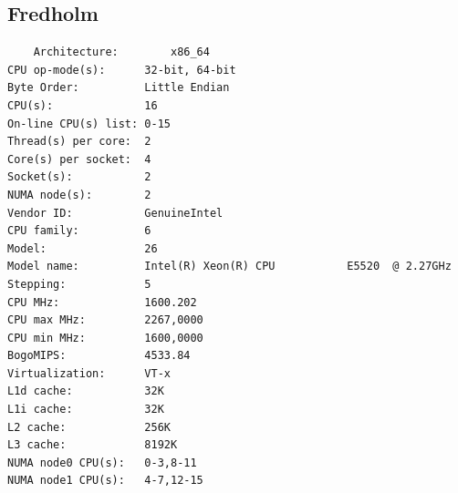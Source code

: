 \documentclass{article}
\begin{document}
\subsection{Fredholm}
\begin{verbatim}
    Architecture:        x86_64
CPU op-mode(s):      32-bit, 64-bit
Byte Order:          Little Endian
CPU(s):              16
On-line CPU(s) list: 0-15
Thread(s) per core:  2
Core(s) per socket:  4
Socket(s):           2
NUMA node(s):        2
Vendor ID:           GenuineIntel
CPU family:          6
Model:               26
Model name:          Intel(R) Xeon(R) CPU           E5520  @ 2.27GHz
Stepping:            5
CPU MHz:             1600.202
CPU max MHz:         2267,0000
CPU min MHz:         1600,0000
BogoMIPS:            4533.84
Virtualization:      VT-x
L1d cache:           32K
L1i cache:           32K
L2 cache:            256K
L3 cache:            8192K
NUMA node0 CPU(s):   0-3,8-11
NUMA node1 CPU(s):   4-7,12-15

\end{verbatim}
\end{document}
